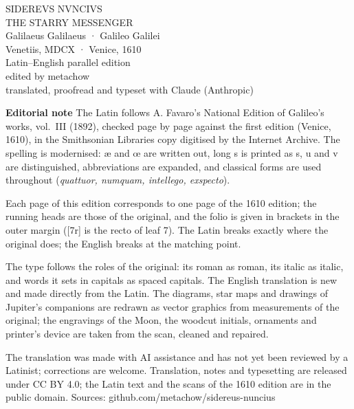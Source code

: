 \thispagestyle{empty}
\begin{center}
\vspace*{26mm}
{\fontsize{26}{30}\selectfont{}SIDEREVS NVNCIVS}\\[4mm]
{\fontsize{16}{20}\selectfont{}THE STARRY MESSENGER}\\[10mm]
{\large Galilaeus Galilaeus · Galileo Galilei}\\[2mm]
{\small Venetiis, MDCX · Venice, 1610}\\[20mm]
{\color{edgray}\small Latin–English parallel edition}\\[6mm]
{\small edited by metachow}\\[1mm]
{\color{edgray}\footnotesize translated, proofread and typeset with Claude (Anthropic)}
\end{center}

\vfill
\noindent\begin{minipage}{\textwidth}
\small\color{edgray}\setlength{\parindent}{1.2em}\linespread{1.15}\selectfont
\textbf{Editorial note}\quad
The Latin follows A. Favaro's National Edition of Galileo's works, vol.\ III (1892), checked page by page against the first edition (Venice, 1610), in the Smithsonian Libraries copy digitised by the Internet Archive. The spelling is modernised: æ and œ are written out, long s is printed as s, u and v are distinguished, abbreviations are expanded, and classical forms are used throughout (\textit{quattuor, numquam, intellego, exspecto}).

Each page of this edition corresponds to one page of the 1610 edition; the running heads are those of the original, and the folio is given in brackets in the outer margin ([7r] is the recto of leaf 7). The Latin breaks exactly where the original does; the English breaks at the matching point.

The type follows the roles of the original: its roman as roman, its italic as italic, and words it sets in capitals as spaced capitals. The English translation is new and made directly from the Latin. The diagrams, star maps and drawings of Jupiter's companions are redrawn as vector graphics from measurements of the original; the engravings of the Moon, the woodcut initials, ornaments and printer's device are taken from the scan, cleaned and repaired.

The translation was made with AI assistance and has not yet been reviewed by a Latinist; corrections are welcome. Translation, notes and typesetting are released under CC BY 4.0; the Latin text and the scans of the 1610 edition are in the public domain. Sources: github.com/metachow/sidereus-nuncius
\end{minipage}
\cleardoublepage
